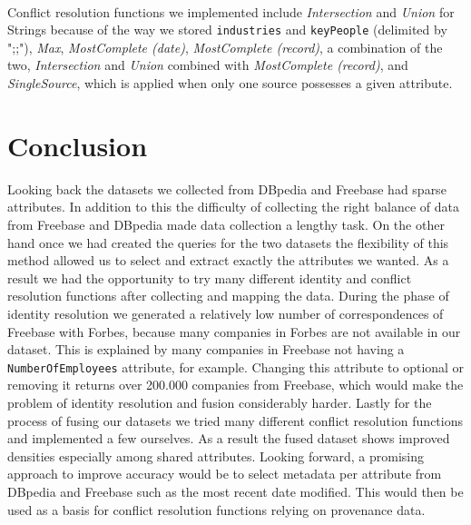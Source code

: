 \paragraph{}Conflict resolution functions we implemented include \textit{Intersection} and \textit{Union} for Strings because of the way we stored \texttt{industries} and \texttt{keyPeople} (delimited by ";;"), \textit{Max}, \textit{MostComplete (date)}, \textit{MostComplete (record)}, a combination of the two, \textit{Intersection} and \textit{Union} combined with \textit{MostComplete (record)}, and \textit{SingleSource}, which is applied when only one source possesses a given attribute.









\section{Conclusion}
Looking back the datasets we collected from DBpedia and Freebase had sparse attributes. In addition to this the difficulty of collecting the right balance of data from Freebase and DBpedia made data collection a lengthy task. On the other hand once we had created the queries for the two datasets the flexibility of this method allowed us to select and extract exactly the attributes we wanted. As a result we had the opportunity to try many different identity and conflict resolution functions after collecting and mapping the data. During the phase of identity resolution we generated a relatively low number of correspondences of Freebase with Forbes, because many companies in Forbes are not available in our dataset. This is explained by many companies in Freebase not having a \texttt{NumberOfEmployees} attribute, for example. Changing this attribute to optional or removing it returns over 200.000 companies from Freebase, which would make the problem of identity resolution and fusion considerably harder. Lastly for the process of fusing our datasets we tried many different conflict resolution functions and implemented a few ourselves. As a result the fused dataset shows improved densities especially among shared attributes. Looking forward, a promising approach to improve accuracy would be to select metadata per attribute from DBpedia and Freebase such as the most recent date modified. This would then be used as a basis for conflict resolution functions relying on provenance data. 
















